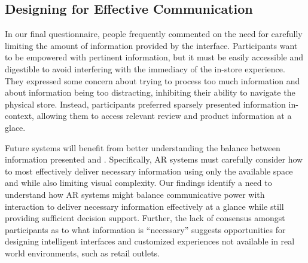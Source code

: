 \subsection{Designing for Effective Communication}
In our final questionnaire, people frequently commented on the need for carefully limiting the amount of information provided by the interface.  %
Participants want to be empowered with pertinent information, but it must be easily accessible and digestible to avoid interfering with the immediacy of the in-store experience. They expressed some concern about trying to process too much information and about information being too distracting, inhibiting their ability to navigate the physical store. Instead, participants preferred sparsely presented information in-context, allowing them to access relevant review and product information at a glace. 

Future systems will benefit from better understanding the balance between information presented and . Specifically, AR systems must carefully consider how to most effectively deliver necessary information using only the available space and while also limiting visual complexity. Our findings identify a need to understand how AR systems might balance communicative power with interaction to deliver necessary information effectively at a glance while still providing sufficient decision support. Further, the lack of consensus amongst participants as to what information is ``necessary'' suggests opportunities for designing intelligent interfaces and customized experiences not available in real world environments, such as retail outlets. 

